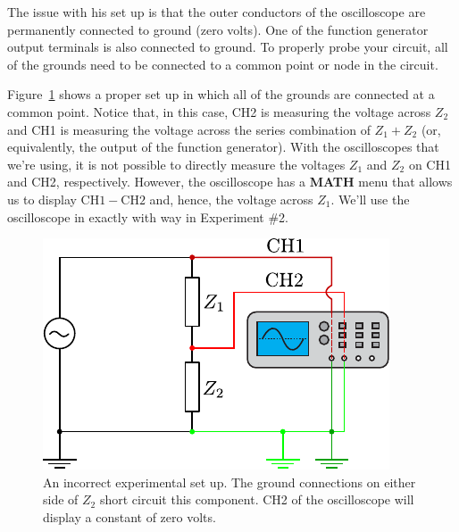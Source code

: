 \documentclass[12pt,oneside,openany,letterpaper]{article}
\begin{document}
\noindent The issue with his set up is that the outer conductors of the oscilloscope are permanently connected to ground (zero volts).  One of the function generator output terminals is also connected to ground.  To properly probe your circuit, all of the grounds need to be connected to a common point or node in the circuit.

\clearpage

\noindent Figure~\ref{fig:fig2} shows a proper set up in which all of the grounds are connected at a common point. Notice that, in this case, CH2 is measuring the voltage across $Z_2$ and CH1 is measuring the voltage across the series combination of $Z_1 + Z_2$ (or, equivalently, the output of the function generator).  With the oscilloscopes that we're using, it is not possible to directly measure the voltages $Z_1$ and $Z_2$ on CH1 and CH2, respectively.  However, the oscilloscope has a {\bf MATH} menu that allows us to display $\mathrm{CH1} - \mathrm{CH2}$ and, hence, the voltage across $Z_1$.  We'll use the oscilloscope in exactly with way in Experiment \#2.

\begin{figure}[h!]
\begin{center}
\includegraphics[width=.5\textwidth]{figures/Lab1Fig2.pdf}\caption{\label{fig:fig2}An incorrect experimental set up.  The ground connections on either side of $Z_2$ short circuit this component.  CH2 of the oscilloscope will  display a constant of zero volts.}
\end{center}
\end{figure}
\end{document}
